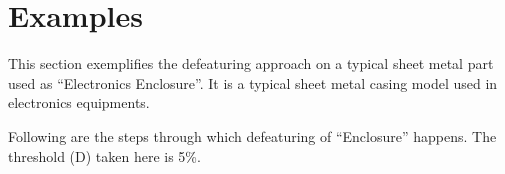 
\section{Examples} \label{sec:defeaturing:results}


This section exemplifies the defeaturing approach on a typical sheet metal part used as ``Electronics Enclosure''.  It is a typical sheet metal casing model used in electronics equipments. 


Following are the steps through which defeaturing of ``Enclosure'' happens. The threshold (D) taken here is 5\%.






